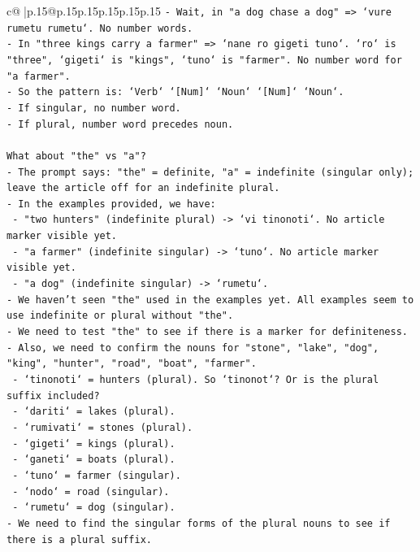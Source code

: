 \documentclass{article}
\begin{document}
{\begin{supertabular}{c@{$\;$}|p{.15\linewidth}@{}p{.15\linewidth}p{.15\linewidth}p{.15\linewidth}p{.15\linewidth}p{.15\linewidth}}
{{{\texttt{{-} Wait, in "a dog chase a dog" => `vure rumetu rumetu`. No number words.} \\
\texttt{{-} In "three kings carry a farmer" => `nane ro gigeti tuno`. `ro` is "three", `gigeti` is "kings", `tuno` is "farmer". No number word for "a farmer".} \\
\texttt{{-} So the pattern is: `Verb` `{[}Num{]}` `Noun` `{[}Num{]}` `Noun`.} \\
\texttt{{-} If singular, no number word.} \\
\texttt{{-} If plural, number word precedes noun.} \\
\\ 
\texttt{What about "the" vs "a"?} \\
\texttt{{-} The prompt says: "the" = definite, "a" = indefinite (singular only); leave the article off for an indefinite plural.} \\
\texttt{{-} In the examples provided, we have:} \\
\texttt{  {-} "two hunters" (indefinite plural) {-}> `vi tinonoti`. No article marker visible yet.} \\
\texttt{  {-} "a farmer" (indefinite singular) {-}> `tuno`. No article marker visible yet.} \\
\texttt{  {-} "a dog" (indefinite singular) {-}> `rumetu`.} \\
\texttt{{-} We haven't seen "the" used in the examples yet. All examples seem to use indefinite or plural without "the".} \\
\texttt{{-} We need to test "the" to see if there is a marker for definiteness.} \\
\texttt{{-} Also, we need to confirm the nouns for "stone", "lake", "dog", "king", "hunter", "road", "boat", "farmer".} \\
\texttt{  {-} `tinonoti` = hunters (plural). So `tinonot`? Or is the plural suffix included?} \\
\texttt{  {-} `dariti` = lakes (plural).} \\
\texttt{  {-} `rumivati` = stones (plural).} \\
\texttt{  {-} `gigeti` = kings (plural).} \\
\texttt{  {-} `ganeti` = boats (plural).} \\
\texttt{  {-} `tuno` = farmer (singular).} \\
\texttt{  {-} `nodo` = road (singular).} \\
\texttt{  {-} `rumetu` = dog (singular).} \\
\texttt{{-} We need to find the singular forms of the plural nouns to see if there is a plural suffix.} \\
}}}
\end{supertabular}}
\end{document}
